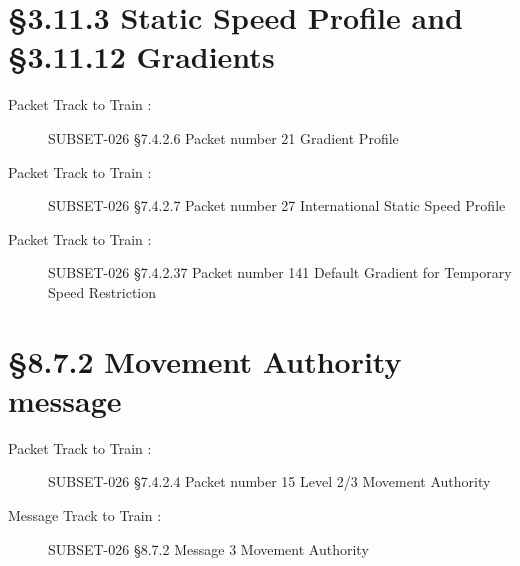 \documentclass{template/openetcs_report}
\begin{document}
\section{\S3.11.3 Static Speed Profile and §3.11.12 Gradients}
\begin{description}
\item [Packet Track to Train :] SUBSET-026 \S7.4.2.6 Packet number 21 Gradient Profile
\item [Packet Track to Train :] SUBSET-026 \S7.4.2.7 Packet number 27 International Static Speed Profile
\item [Packet Track to Train :] SUBSET-026 \S7.4.2.37 Packet number 141	Default Gradient for Temporary Speed Restriction
\end{description}

\section{\S8.7.2 Movement Authority message}
\begin{description}
\item [Packet Track to Train :] SUBSET-026 \S7.4.2.4 Packet number 15 Level 2/3 Movement Authority
\item [Message Track to Train :] SUBSET-026 \S8.7.2 Message 3 Movement Authority 
\end{description}
\end{document}
